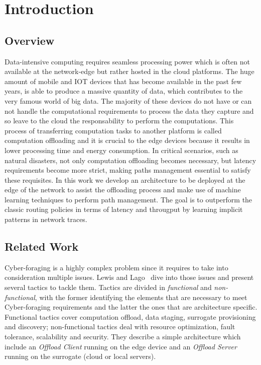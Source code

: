 \chapter{Introduction}

\section{Overview}
Data-intensive computing requires seamless processing power which is often not available at the network-edge but rather hosted in the cloud platforms. The huge amount of mobile and IOT devices that has become available in the past few years, is able to produce a massive quantity of data, which contributes to the very famous world of big data. The majority of these devices do not have or can not handle the computational requirements to process the data they capture and so leave to the cloud the responsability to perform the computations. This process of transferring computation tasks to another platform is called computation offloading and it is crucial to the edge devices because it results in lower processing
time and energy consumption. In critical scenarios, such as natural disasters, not only computation offloading becomes necessary, but latency requirements become more strict, making paths management essential to satisfy these requisites. In this work we develop an architecture to be deployed at the edge of the network to assist the offloading process and make use of machine learning techniques to perform path management. The goal is to outperform the classic routing policies in terms of latency and througput by learning implicit patterns in network traces.

\section{Related Work}
Cyber-foraging is a highly complex problem since it requires to take into consideration multiple issues. Lewis and Lago~\cite{catalog} dive into those issues and present several tactics to tackle them. Tactics are divided in \textit{functional} and \textit{non-functional}, with the former identifying the elements that are necessary to meet Cyber-foraging requirements and the latter the ones that are architecture specific. Functional tactics cover computation offload, data staging, surrogate provisioning and discovery; non-functional tactics deal with resource optimization, fault tolerance, scalability and security. They describe a simple architecture which include an \textit{Offload Client} running on the edge device and an \textit{Offload Server} running on the surrogate (cloud or local servers).

